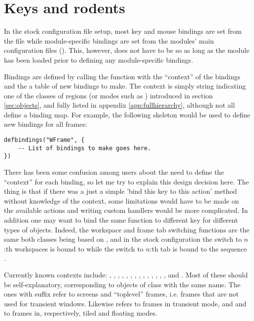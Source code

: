 \section{Keys and rodents}
\label{sec:bindings}

In the stock configuration file setup, most key and mouse bindings are set
from the file  while module-specific bindings
are set from the modules' main configuration files ().
This, however, does not have to be so as long as the module has been
loaded prior to defining any module-specific bindings.

Bindings are defined by calling the function 
 with the ``context'' of the
bindings and the a table of new bindings to make. The context is simply
string indicating one of the classes of regions (or modes such as
) introduced in section \ref{sec:objects}, and fully
listed in appendix \ref{app:fullhierarchy}, although not all define
a binding map. For example, the following skeleton would be used to 
define new bindings for all frames:

\begin{verbatim}
defbindings("WFrame", {
    -- List of bindings to make goes here.
})
\end{verbatim}

There has been some confusion among users about the need to define the
``context'' for each binding, so let me try to explain this design
decision here. The thing is that if there was a just a simple 'bind this 
key to this action' method without knowledge of the context, some 
limitations would have to be made on the available actions and writing 
custom handlers would be more complicated. In addition one may want to 
bind the same function to different key for different types of objects.
Indeed, the workspace and frame tab switching functions are the same both
classes being based on , and in the stock configuration the 
switch to $n$:th workspaces is bound to  while the switch to 
$n$:th tab is bound to the sequence .

Currently known contexts include: 
,
,
,
,
,
,
,
,
,
,
,
,
,
, and
.
Most of these should be self-explanatory, corresponding to objects
of class with the same name. The ones with  suffix
refer to screens and ``toplevel''  frames, i.e. frames that are
not used for transient windows. Likewise  refers
to frames in transient mode, and  and 
to frames in, respectively, tiled and floating modes. 

